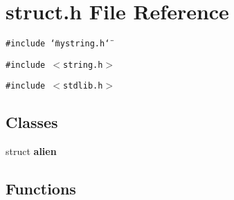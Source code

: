 \section{struct.h File Reference}
\label{struct_8h}
{\tt \#include \char`\"{}mystring.h\char`\"{}}\par
{\tt \#include $<$string.h$>$}\par
{\tt \#include $<$stdlib.h$>$}\par
\subsection*{Classes}
\begin{CompactItemize}
\item 
struct \bf{alien}
\end{CompactItemize}
\subsection*{Functions}
